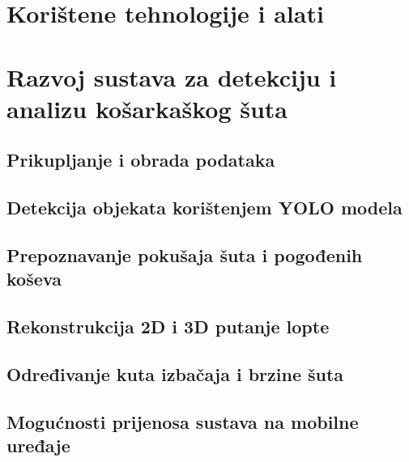 \documentclass[zavrsnirad]{fer}
\begin{document}
\chapter{Korištene tehnologije i alati}
\label{pog:korištene_tehnologije_i_alati}


\chapter{Razvoj sustava za detekciju i analizu košarkaškog šuta}
\label{pog:razvoj_sustava_za_detekciju_i_analizu_kosarkaskog_suta}

\section{Prikupljanje i obrada podataka}
\label{pog:prikupljanje_i_obrada_podataka}

\section{Detekcija objekata korištenjem YOLO modela}
\label{pog:detekcija_objekata_koristenjem_yolo_modela}


\section{Prepoznavanje pokušaja šuta i pogođenih koševa}
\label{pog:prepoznavanje_pokusaja_suta_i_pogodenih_koseva}

\section{Rekonstrukcija 2D i 3D putanje lopte}
\label{pog:rekonstrukcija_2d_i_3d_putanje_lopte}

\section{Određivanje kuta izbačaja i brzine šuta}
\label{pog:odredivanje_kuta_izbacaja_i_brzine_suta}


\section{Mogućnosti prijenosa sustava na mobilne uređaje}
\label{pog:mogucnosti_prijenosa_sustava_na_mobilne_uredaje}


\end{document}
